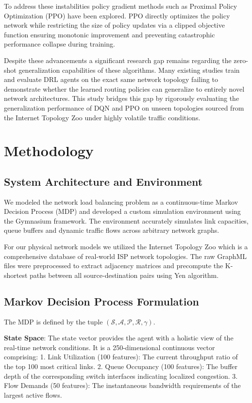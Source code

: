 \documentclass[10pt,twocolumn,letterpaper]{article}
\begin{document}
To address these instabilities policy gradient methods such as Proximal Policy Optimization (PPO) \cite{schulman2017proximal} have been explored. PPO directly optimizes the policy network while restricting the size of policy updates via a clipped objective function ensuring monotonic improvement and preventing catastrophic performance collapse during training.

Despite these advancements a significant research gap remains regarding the zero-shot generalization capabilities of these algorithms. Many existing studies train and evaluate DRL agents on the exact same network topology failing to demonstrate whether the learned routing policies can generalize to entirely novel network architectures. This study bridges this gap by rigorously evaluating the generalization performance of DQN and PPO on unseen topologies sourced from the Internet Topology Zoo \cite{knight2011internet} under highly volatile traffic conditions.

\section{Methodology}

\subsection{System Architecture and Environment}
We modeled the network load balancing problem as a continuous-time Markov Decision Process (MDP) and developed a custom simulation environment using the Gymnasium framework. The environment accurately simulates link capacities, queue buffers and dynamic traffic flows across arbitrary network graphs.

For our physical network models we utilized the Internet Topology Zoo \cite{knight2011internet} which is a comprehensive database of real-world ISP network topologies. The raw GraphML files were preprocessed to extract adjacency matrices and precompute the K-shortest paths between all source-destination pairs using Yen algorithm.

\subsection{Markov Decision Process Formulation}
The MDP is defined by the tuple $(\mathcal{S}, \mathcal{A}, \mathcal{P}, \mathcal{R}, \gamma)$.

\textbf{State Space}: The state vector provides the agent with a holistic view of the real-time network conditions. It is a 250-dimensional continuous vector comprising:
1. Link Utilization (100 features): The current throughput ratio of the top 100 most critical links.
2. Queue Occupancy (100 features): The buffer depth of the corresponding switch interfaces indicating localized congestion.
3. Flow Demands (50 features): The instantaneous bandwidth requirements of the largest active flows.
\end{document}
